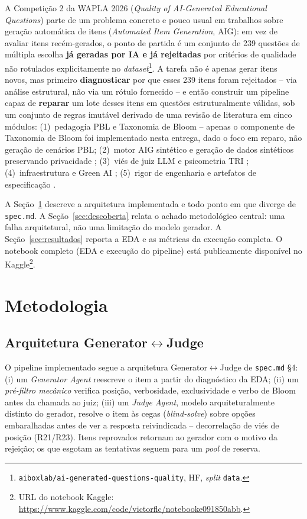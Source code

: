 \documentclass[12pt]{article}
\begin{document}
A Competição 2 da WAPLA 2026 (\emph{Quality of AI-Generated Educational
Questions}) parte de um problema concreto e pouco usual em trabalhos sobre
geração automática de itens (\emph{Automated Item Generation}, AIG): em vez
de avaliar itens recém-gerados, o ponto de partida é um conjunto de 239
questões de múltipla escolha \textbf{já geradas por IA e já rejeitadas} por
critérios de qualidade não rotulados explicitamente no
\emph{dataset}\footnote{\texttt{aiboxlab/ai-generated-questions-quality},
  HF, \emph{split} \texttt{data}.}. A tarefa não é apenas
gerar itens novos, mas primeiro \textbf{diagnosticar} por que esses 239 itens
foram rejeitados -- via análise estrutural, não via um rótulo fornecido -- e
então construir um pipeline capaz de \textbf{reparar} um lote desses itens em
questões estruturalmente válidas, sob um conjunto de regras imutável derivado
de uma revisão de literatura em cinco módulos: (1)~pedagogia PBL e Taxonomia
de Bloom \cite{chen2026automated} -- apenas o componente de Taxonomia de
Bloom foi implementado nesta entrega, dado o foco em reparo, não geração
de cenários PBL; (2)~motor AIG sintético e geração de dados
sintéticos preservando privacidade \cite{seedat2025datacentric}; (3)~viés de
juiz LLM e psicometria TRI \cite{zheng2023judging}; (4)~infraestrutura e
Green AI \cite{bai2024beyond}; (5)~rigor de engenharia e artefatos de
especificação \cite{piskala2026specdriven}.

A Seção~\ref{sec:metodologia} descreve a arquitetura implementada e todo
ponto em que diverge de \texttt{spec.md}. A Seção~\ref{sec:descoberta}
relata o achado metodológico central: uma falha arquitetural, não uma
limitação do modelo gerador. A Seção~\ref{sec:resultados} reporta a EDA
e as métricas da execução completa. O notebook completo (EDA e execução
do pipeline) está publicamente disponível no
Kaggle\footnote{URL do notebook Kaggle: \url{https://www.kaggle.com/code/victorflc/notebooke091850abb}.}.

\section{Metodologia}
\label{sec:metodologia}

\subsection{Arquitetura Generator$\leftrightarrow$Judge}

O pipeline implementado segue a arquitetura
Generator$\leftrightarrow$Judge de \texttt{spec.md} \S4: (i) um
\emph{Generator Agent} reescreve o item a partir do diagnóstico da EDA;
(ii) um \emph{pré-filtro mecânico} verifica posição, verbosidade,
exclusividade e verbo de Bloom antes da chamada ao juiz; (iii) um
\emph{Judge Agent}, modelo arquiteturalmente distinto do gerador,
resolve o item às cegas (\emph{blind-solve}) sobre opções embaralhadas
antes de ver a resposta reivindicada -- decorrelação de viés de posição
(R21/R23). Itens reprovados retornam ao gerador com o motivo da
rejeição; os que esgotam as tentativas seguem para um \emph{pool} de
reserva.
\end{document}
